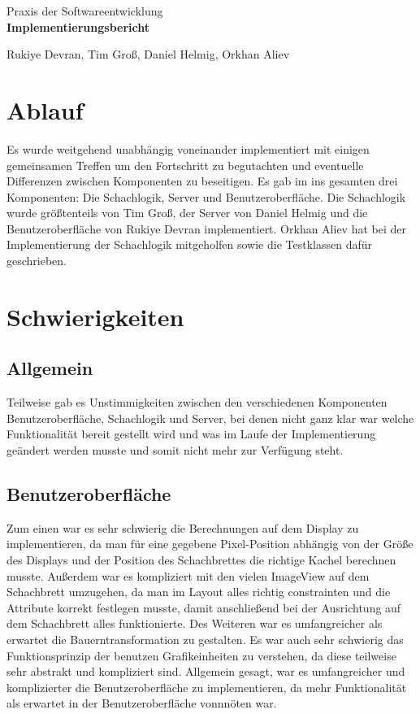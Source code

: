 \documentclass[parskip=full]{scrartcl}
\begin{document}
	\begin{titlepage}
		
		\centering
		\vspace*{0.2\textheight}
		{\Large Praxis der Softwareentwicklung}\\[\baselineskip]
		\vspace{2cm}
		{\Huge \textbf{Implementierungsbericht}}\\[\baselineskip]\par
		\vspace{2cm}
		{\LARGE Rukiye Devran, Tim Groß, Daniel Helmig, Orkhan Aliev}\par		
		\newpage	
		\tableofcontents
		\pagebreak
		
	\end{titlepage}
	\section{Ablauf}
	Es wurde weitgehend unabhängig voneinander implementiert mit einigen gemeinsamen Treffen um den Fortschritt zu begutachten und eventuelle Differenzen zwischen Komponenten zu beseitigen. 
Es gab im ins gesamten drei Komponenten: Die Schachlogik, Server und Benutzeroberfläche.
Die Schachlogik wurde größtenteils von Tim Groß, der Server von Daniel Helmig und die Benutzeroberfläche von Rukiye Devran implementiert. Orkhan Aliev hat bei der Implementierung der Schachlogik mitgeholfen sowie die Testklassen dafür geschrieben.

	\section{Schwierigkeiten}
		\subsection{Allgemein} 
		Teilweise gab es Unstimmigkeiten zwischen den verschiedenen Komponenten Benutzeroberfläche, Schachlogik und Server, bei denen nicht ganz klar war welche Funktionalität bereit gestellt wird und was im Laufe der Implementierung geändert werden musste und somit nicht mehr zur Verfügung steht. 
		
		\subsection{Benutzeroberfläche}	Zum einen war es sehr schwierig die Berechnungen auf dem Display zu implementieren, da man für eine gegebene Pixel-Position abhängig von der Größe des Displays und der Position des Schachbrettes die richtige Kachel berechnen musste. 
Außerdem war es kompliziert mit den vielen ImageView auf dem Schachbrett umzugehen, da man im Layout alles richtig constrainten und die Attribute korrekt festlegen musste, damit anschließend bei der Ausrichtung auf dem Schachbrett alles funktionierte.
Des Weiteren war es umfangreicher als erwartet die Bauerntransformation zu gestalten.
Es war auch sehr schwierig das Funktionsprinzip der benutzen Grafikeinheiten zu verstehen, da diese teilweise sehr abstrakt und kompliziert sind. 
Allgemein gesagt, war es umfangreicher und komplizierter die Benutzeroberfläche zu implementieren, da mehr Funktionalität als erwartet in der Benutzeroberfläche vonnnöten war. 
	
\end{document}
